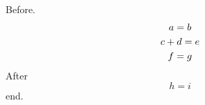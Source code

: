 \documentclass[10pt]{article}
\begin{document}
Before.
\begin{gather}
 a = b \\
 c + d = e \notag \\
 f = g
\end{gather}
After \begin{equation} h = i \end{equation} end.
\end{document}

